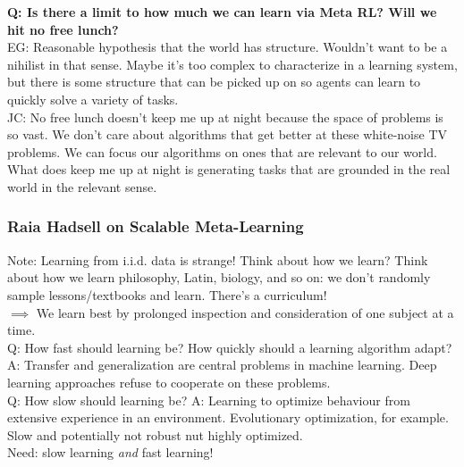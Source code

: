 {\bf Q: Is there a limit to how much we can learn via Meta RL? Will we hit no free lunch?} \\

EG: Reasonable hypothesis that the world has structure. Wouldn't want to be a nihilist in that sense. Maybe it's too complex to characterize in a learning system, but there is some structure that can be picked up on so agents can learn to quickly solve a variety of tasks. \\

JC: No free lunch doesn't keep me up at night because the space of problems is so vast. We don't care about algorithms that get better at these white-noise TV problems. We can focus our algorithms on ones that are relevant to our world. What does keep me up at night is generating tasks that are grounded in the real world in the relevant sense. \\




\subsubsection{Raia Hadsell on Scalable Meta-Learning}

Note: Learning from i.i.d. data is strange! Think about how we learn? Think about how we learn philosophy, Latin, biology, and so on: we don't randomly sample lessons/textbooks and learn. There's a curriculum! \\

$\implies$ We learn best by prolonged inspection and consideration of one subject at a time. \\

Q: How fast should learning be? How quickly should a learning algorithm adapt? \\

A: Transfer and generalization are central problems in machine learning. Deep learning approaches refuse to cooperate on these problems. \\

Q: How slow should learning be?
A: Learning to optimize behaviour from extensive experience in an environment. Evolutionary optimization, for example. Slow and potentially not robust nut highly optimized. \\

Need: slow learning {\it and} fast learning! \\

